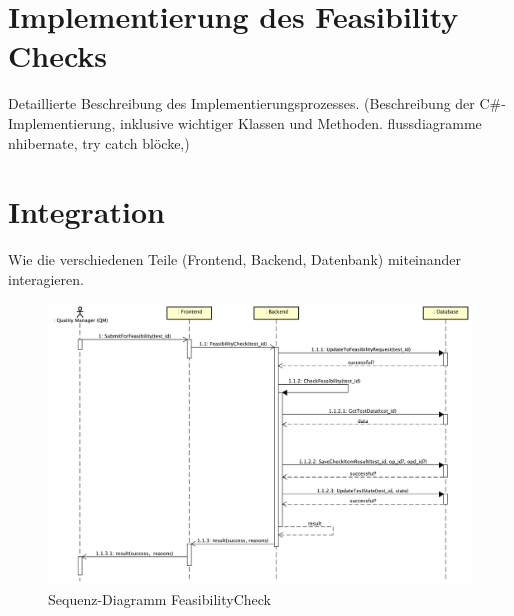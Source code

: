 \section{Implementierung des Feasibility Checks}
Detaillierte Beschreibung des Implementierungsprozesses.
(Beschreibung der C\#-Implementierung, inklusive wichtiger Klassen und Methoden.
flussdiagramme
nhibernate, try catch blöcke,)
\section{Integration}
Wie die verschiedenen Teile (Frontend, Backend, Datenbank) miteinander interagieren.

\begin{figure}[!h]
    \centering
    \includegraphics[width=1\textwidth]{bilder/Sequence-Integration.png}
    \caption{Sequenz-Diagramm FeasibilityCheck}
    \label{fig:sequence-diagram}
\end{figure}